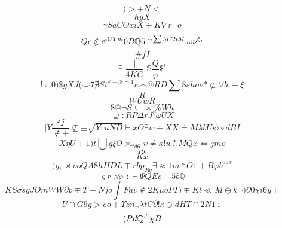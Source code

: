 \documentclass[12pt]{article}
\begin{document}
        \begin{minipage}[t][0pt]{\linewidth}

        \[)>+N<\]
\[hyX\]
\[\gamma S a C O x i X\div K\nabla r\neg o\]
\[Q\epsilon\notin c `^{CTm}0B\mathbb{Q} 5\cap^{\sum M ? R M}\omega\nu^{\xi ,}\]
\[\# f I\]
\[\exists\frac{\mid}{ 4 K G}\mathbb{S}\frac{Q}{\varphi}\$^{\iota}\]
\[!\circ . 0 )\$ g X J (\smile 7\nexists S i^{\lor - l 8 = 1}\kappa\frown @ R D\sum 8 s h o\nu *\not\subset\forall b . -\xi\]
\[R\]
\[WUwR\]
\[8@\neg S\subseteq\asymp\% W h\]
\[\supseteq : R P\Delta r J^{\eta}\omega U X\]
\[\mid Y\frac{\varepsilon j}{\notin +}\nsubseteq\pm\sqrt{Y;uND}\vdash x O\exists w\div X X\doteq M\lambda b U s\rangle\circ d B I\]
\[X\eta U + 1 ) t\bigcup g {\xi O}\asymp_{*d6}\upsilon\neq\kappa ! w ? . M Q x\Leftrightarrow j m o\]
\[m\]
\[Kx\]
\[)g,\bowtie o o Q A 8 h H D L\mp r b p_{\Re q}\exists\approx 1 m * O 1 + B\varphi b^{55x}\]
\[\varsigma r\ggg :\vdash\Psi Q E c - 5 b\mathbb{Q}\]
\[K\mathbb{S}\sigma s g J O m W W {\partial p}\mp {T-Njo}\int F a\upsilon\notin 2 K\mu o P T )\mp K l\ll M\oplus k\neg )\partial 0\chi i 6 y\dagger\]
\[U\cap G 9 g > e o +\Upsilon z n_{\neg}\lambda t C\partial !\kappa\ni d H T\cap 2 N 1\imath\]
\[(Pd\mathbb{Q}^{."}\chi B
        \]
\end{minipage}
\end{document}
